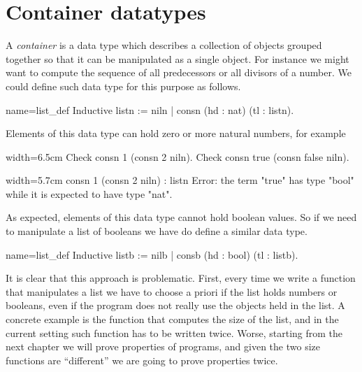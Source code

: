 

\section{Container datatypes}\label{sec:poly}


A \emph{container} is a data type which describes a collection of
objects grouped together so that it can be manipulated as a single
object. For instance we might want to compute the sequence of all
predecessors or all divisors of a number.  We could define such data
type for this purpose as follows.

\begin{coq}{name=list_def}{}
Inductive listn := niln | consn (hd : nat) (tl : listn).
\end{coq}

Elements of this data type can hold zero or more natural numbers, for example

\begin{coq}{}{width=6.5cm}
Check consn 1 (consn 2 niln).
Check consn true (consn false niln).
$~$
$~$
\end{coq}{}{}
\begin{coqout}{}{width=5.7cm}
consn 1 (consn 2 niln) : listn
Error: the term "true" has
type "bool" while it is
expected to have type "nat".
\end{coqout}{}{}

As expected, elements of this data type cannot hold boolean values.
So if we need to
manipulate a list of booleans we have do define a similar data type.

\begin{coq}{name=list_def}{}
Inductive listb := nilb | consb (hd : bool) (tl : listb).
\end{coq}

It is clear that this approach is problematic.  First, every time we
write a function that manipulates a list we have to choose a priori
if the list holds numbers or booleans, even if the program does not
really use the objects held in the list.
A concrete example is the function that computes the size of the list,
and in the current setting such function has to be written twice.
Worse, starting from the next chapter we will prove properties of programs,
and given the two size functions are ``different'' we are going to prove
properties twice.

